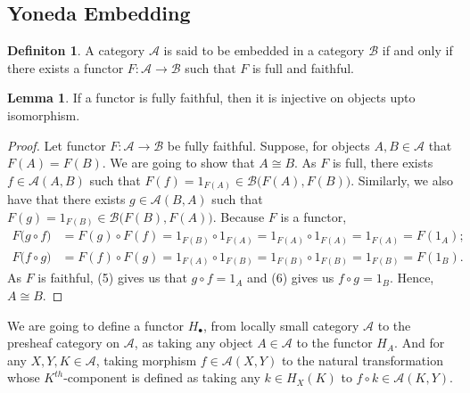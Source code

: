 \documentclass[18pt,a4paper]{article}
\theoremstyle{definition}
\newtheorem{definition}[theorem]{Definiton}
\newtheorem{lemma}[theorem]{Lemma}
\begin{document}
	\subsection{Yoneda Embedding}%
	\begin{definition} %
		A category $\mathcal{A}$  is said to be embedded in a category $\mathcal{B}$ if
		and only if there exists a functor $F: \mathcal{A} \to \mathcal{B}$
		such that $F$ is full and faithful.
	\end{definition} %

	\begin{lemma}
		If a functor is fully faithful, then it is injective on objects upto isomorphism.
	\end{lemma}
	\begin{proof}
		Let functor $F:\mathcal{A} \to \mathcal{B} $ be fully faithful. Suppose, for
		objects $A,B\in \mathcal{A} $ that $F(A)=F(B)$. We are going to show that
		$A\cong B$. As $F$ is full, there exists $f \in \mathcal{A} (A,B)$ such that
		$F(f)=1_{F(A)}\in \mathcal{B} \big(F(A),F(B)\big)$. Similarly, we also have that
		there exists $g \in \mathcal{A} (B,A)$ such that
		$F(g)=1_{F(B)}\in \mathcal{B} \big(F(B),F(A)\big)$. Because $F$ is a functor,
		\begin{align}
			F\big( g \circ f \big)&=F(g) \circ F(f) = 1_{F(B)} \circ 1_{F(A)}=
	1_{F(A)} \circ 1_{F(A)}=1_{F(A)}=F(1_A); \\
			F\big( f \circ g \big)&=F(f) \circ F(g) = 1_{F(A)} \circ 1_{F(B)}=
	1_{F(B)} \circ 1_{F(B)}=1_{F(B)}=F(1_B).
		\end{align}
		As $F$ is faithful, (5) gives us that $g\circ f=1_A$ and (6) gives us
		$f \circ g = 1_B$. Hence, $A\cong B$.

	\end{proof}

	We are going to define a functor $H_\bullet$, from locally small category $\mathcal{A}$ to the presheaf category on
	$\mathcal{A} $, as taking any object $A \in \mathcal{A} $ to the functor $H_A$.
	And for any $X,Y,K \in \mathcal{A}$, taking morphism $f\in \mathcal{A} (X,Y)$
	to the natural transformation whose $K^{th}$-component is defined as taking any $k \in H_X(K)$
	to $f \circ k \in \mathcal{A} (K,Y)$.
\end{document}
